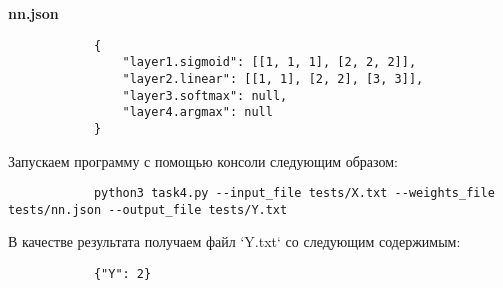 \documentclass[bachelor, och, report]{shiza}
\begin{document}
        \textbf{nn.json}
        \begin{verbatim}
            {
                "layer1.sigmoid": [[1, 1, 1], [2, 2, 2]],
                "layer2.linear": [[1, 1], [2, 2], [3, 3]],
                "layer3.softmax": null,
                "layer4.argmax": null
            }
        \end{verbatim}

        Запускаем программу с помощью консоли следующим образом:

        \begin{verbatim}
            python3 task4.py --input_file tests/X.txt --weights_file tests/nn.json --output_file tests/Y.txt
        \end{verbatim}

        В качестве результата получаем файл `Y.txt` со следующим содержимым:

        \begin{verbatim}
            {"Y": 2}
        \end{verbatim}
\end{document}
